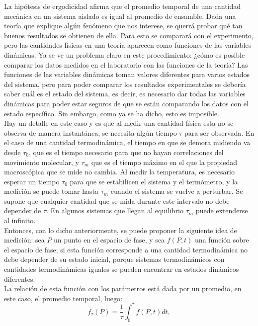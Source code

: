 La hipótesis de ergodicidad afirma que el promedio temporal de una cantidad mecánica en un sistema aislado es igual al promedio de ensamble. Dada una teoría que explique algún fenómeno que nos interese, se querrá probar qué tan buenos resultados se obtienen de ella. Para esto se comparará con el experimento, pero las cantidades físicas en una teoría aparecen como funciones de las variables dinámicas. Ya se ve un problema claro en este procedimiento: ¿cómo es posible comparar los datos medidos en el laboratorio con las funciones de la teoría? Las funciones de las variables dinámicas toman valores diferentes para varios estados del sistema, pero para poder comparar los resultados experimentales se debería saber cuál es el estado del sistema, es decir, es necesario dar todas las variables dinámicas para poder estar seguros de que se están comparando los datos con el estado específico. Sin embargo, como ya se ha dicho, esto es imposible.
\\
Hay un detalle en este caso y es que al medir una cantidad física esta no se observa de manera instantánea, se necesita algún tiempo $\tau$ para ser observada. En el caso de una cantidad termodinámica, el tiempo en que se demora midiendo va desde $\tau_{0}$, que es el tiempo necesario para que no hayan correlaciones del movimiento molecular, y  $\tau_{m}$ que es el tiempo máximo en el que la propiedad macroscópica que se mide no cambia. Al medir la temperatura, es necesario esperar un tiempo $\tau_{0}$ para que se estabilicen el sistema y el termómetro, y la medición se puede tomar hasta $\tau_{m}$ cuando el sistema se vuelve a perturbar. Se supone que cualquier cantidad que se mida durante este intervalo no debe depender de $\tau$. En algunos sistemas que llegan al equilibrio $\tau_{m}$ puede extenderse al infinito.
\\
Entonces, con lo dicho anteriormente, se puede proponer la siguiente idea de medición: sea $P$ un punto en el espacio de fase, y sea $f(P,t)$ una función sobre el espacio de fase; si esta función corresponde a una cantidad termodinámica no debe depender de su estado inicial, porque sistemas termodinámicos con cantidades termodinámicas iguales se pueden encontrar en estados dinámicos diferentes. \\
La relación de esta función con los parámetros está dada por un promedio, en este caso, el promedio temporal, luego:
\begin{equation}
\overline{f_{\tau}}(P)= \frac{1}{\tau} \int_{0}^{\tau} f(P,t) dt,
\end{equation}
 
